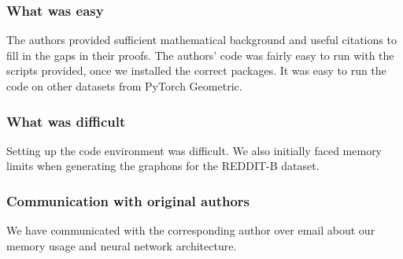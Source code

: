 \subsubsection*{What was easy}
The authors provided sufficient mathematical background and useful citations to fill in the gaps in their proofs. The authors' code was fairly easy to run with the scripts provided, once we installed the correct packages. It was easy to run the code on other datasets from PyTorch Geometric.

\subsubsection*{What was difficult}
Setting up the code environment was difficult. We also initially faced memory limits when generating the graphons for the REDDIT-B dataset.

\subsubsection*{Communication with original authors}
We have communicated with the corresponding author over email about our memory usage and neural network architecture.

